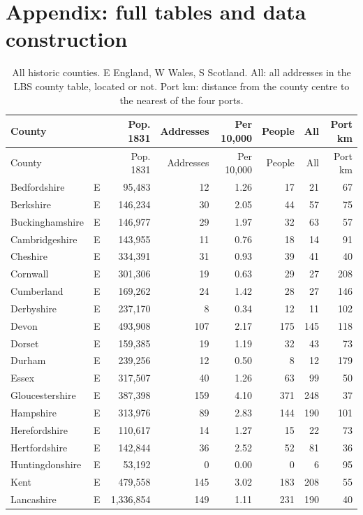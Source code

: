 \documentclass[11pt,a4paper]{article}
\begin{document}
\section{Appendix: full tables and data construction}
{\footnotesize\begin{longtable}{llrrrrrr}\caption{All historic counties. E England, W Wales, S Scotland. All: all addresses in the LBS county table, located or not. Port km: distance from the county centre to the nearest of the four ports.}\label{tab:appx}\\\toprule County & & Pop. 1831 & Addresses & Per 10,000 & People & All & Port km\\\midrule\endfirsthead\toprule County & & Pop. 1831 & Addresses & Per 10,000 & People & All & Port km\\\midrule\endhead
Bedfordshire & E & 95,483 & 12 & 1.26 & 17 & 21 & 67\\
Berkshire & E & 146,234 & 30 & 2.05 & 44 & 57 & 75\\
Buckinghamshire & E & 146,977 & 29 & 1.97 & 32 & 63 & 57\\
Cambridgeshire & E & 143,955 & 11 & 0.76 & 18 & 14 & 91\\
Cheshire & E & 334,391 & 31 & 0.93 & 39 & 41 & 40\\
Cornwall & E & 301,306 & 19 & 0.63 & 29 & 27 & 208\\
Cumberland & E & 169,262 & 24 & 1.42 & 28 & 27 & 146\\
Derbyshire & E & 237,170 & 8 & 0.34 & 12 & 11 & 102\\
Devon & E & 493,908 & 107 & 2.17 & 175 & 145 & 118\\
Dorset & E & 159,385 & 19 & 1.19 & 32 & 43 & 73\\
Durham & E & 239,256 & 12 & 0.50 & 8 & 12 & 179\\
Essex & E & 317,507 & 40 & 1.26 & 63 & 99 & 50\\
Gloucestershire & E & 387,398 & 159 & 4.10 & 371 & 248 & 37\\
Hampshire & E & 313,976 & 89 & 2.83 & 144 & 190 & 101\\
Herefordshire & E & 110,617 & 14 & 1.27 & 15 & 22 & 73\\
Hertfordshire & E & 142,844 & 36 & 2.52 & 52 & 81 & 36\\
Huntingdonshire & E & 53,192 & 0 & 0.00 & 0 & 6 & 95\\
Kent & E & 479,558 & 145 & 3.02 & 183 & 208 & 55\\
Lancashire & E & 1,336,854 & 149 & 1.11 & 231 & 190 & 40\\

\end{longtable}}
\end{document}
